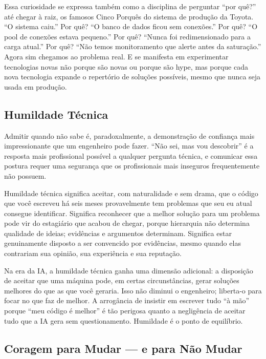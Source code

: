 Essa curiosidade se expressa também como a disciplina de perguntar ``por quê?'' até chegar à raiz, os famosos Cinco Porquês do sistema de produção da Toyota. ``O sistema caiu.'' Por quê? ``O banco de dados ficou sem conexões.'' Por quê? ``O pool de conexões estava pequeno.'' Por quê? ``Nunca foi redimensionado para a carga atual.'' Por quê? ``Não temos monitoramento que alerte antes da saturação.'' Agora sim chegamos ao problema real. E se manifesta em experimentar tecnologias novas não porque são novas ou porque são hype, mas porque cada nova tecnologia expande o repertório de soluções possíveis, mesmo que nunca seja usada em produção.

\subsection{Humildade Técnica}

Admitir quando não sabe é, paradoxalmente, a demonstração de confiança mais impressionante que um engenheiro pode fazer. ``Não sei, mas vou descobrir'' é a resposta mais profissional possível a qualquer pergunta técnica, e comunicar essa postura requer uma segurança que os profissionais mais inseguros frequentemente não possuem.

Humildade técnica significa aceitar, com naturalidade e sem drama, que o código que você escreveu há seis meses provavelmente tem problemas que seu eu atual consegue identificar. Significa reconhecer que a melhor solução para um problema pode vir do estagiário que acabou de chegar, porque hierarquia não determina qualidade de ideias; evidências e argumentos determinam. Significa estar genuinamente disposto a ser convencido por evidências, mesmo quando elas contrariam sua opinião, sua experiência e sua reputação.

Na era da IA, a humildade técnica ganha uma dimensão adicional: a disposição de aceitar que uma máquina pode, em certas circunstâncias, gerar soluções melhores do que as que você geraria. Isso não diminui o engenheiro; liberta-o para focar no que faz de melhor. A arrogância de insistir em escrever tudo ``à mão'' porque ``meu código é melhor'' é tão perigosa quanto a negligência de aceitar tudo que a IA gera sem questionamento. Humildade é o ponto de equilíbrio.

\subsection{Coragem para Mudar --- e para Não Mudar}

